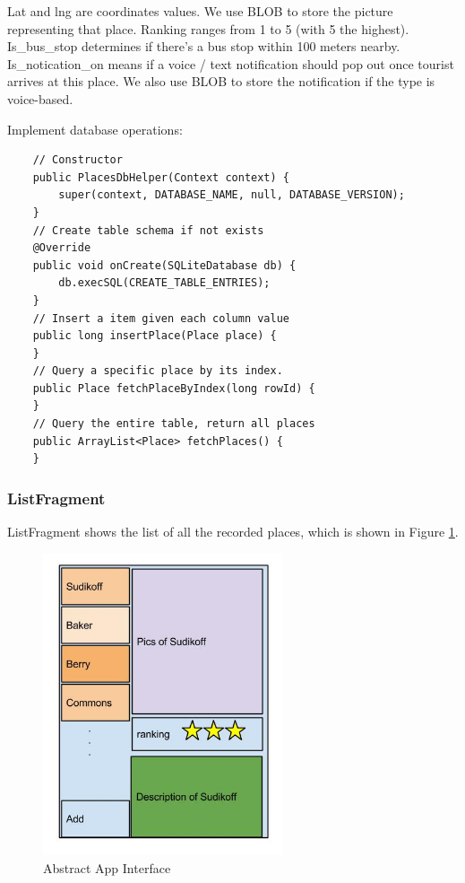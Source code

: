 \documentclass{article}
\begin{document}
Lat and lng are coordinates values. We use BLOB to store the picture representing that place. Ranking ranges from 1 to 5 (with 5 the highest). Is\_bus\_stop determines if there’s a bus stop within 100 meters nearby. Is\_notication\_on means if a voice / text notification should pop out once tourist arrives at this place. We also use BLOB to store the notification if the type is voice-based.

Implement database operations:
\begin{lstlisting}
    // Constructor  
    public PlacesDbHelper(Context context) {
        super(context, DATABASE_NAME, null, DATABASE_VERSION);
    }
    // Create table schema if not exists    
    @Override
    public void onCreate(SQLiteDatabase db) {
        db.execSQL(CREATE_TABLE_ENTRIES);
    }
    // Insert a item given each column value
    public long insertPlace(Place place) {
    }
    // Query a specific place by its index.
    public Place fetchPlaceByIndex(long rowId) {
    }
    // Query the entire table, return all places
    public ArrayList<Place> fetchPlaces() {
    }
\end{lstlisting}

\subsubsection{ListFragment}
ListFragment shows the list of all the recorded places, which is shown in Figure \ref{F:app}.

\begin{figure}[h!]   
\centering
\includegraphics[width = 200pt]{figures/app_interface.jpg}
\caption{Abstract App Interface}
\label{F:app}
\end{figure}
\end{document}
